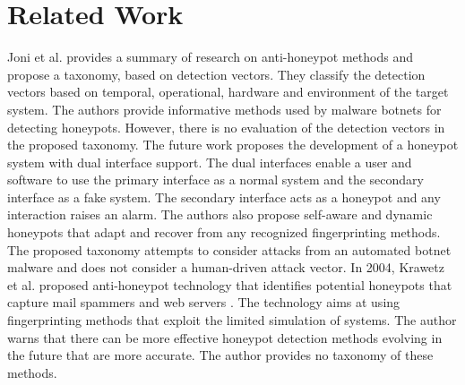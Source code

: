 \section{Related Work}
\label{sec:rw}

Joni et al. \cite{Joni} provides a  summary of research on anti-honeypot methods and propose a taxonomy, based on detection vectors. They classify the detection vectors based on temporal, operational, hardware and environment of the target system. The authors provide informative methods used by malware botnets for detecting honeypots. However, there is no evaluation of the detection vectors in the proposed taxonomy. The future work proposes the development of a honeypot system with dual interface support. The dual interfaces enable a user and software to use the primary interface as a normal system and the secondary interface as a fake system. The secondary interface acts as a honeypot and any interaction raises an alarm. The authors also propose self-aware and dynamic honeypots that adapt and recover from any recognized fingerprinting methods. The proposed taxonomy attempts to consider attacks from an automated botnet malware and does not consider a human-driven attack vector. In 2004, Krawetz et al.  proposed anti-honeypot technology that identifies potential honeypots that capture mail spammers and web servers \cite{krawetz2004anti}. The technology aims at using fingerprinting methods that exploit the limited simulation of systems. The author warns that there can be more effective honeypot detection methods evolving in the future that are more accurate. The author provides no taxonomy of these methods. 

